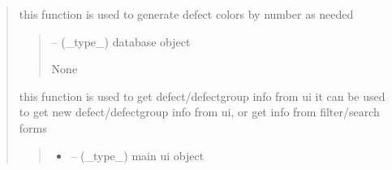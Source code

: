 \documentclass[letterpaper,10pt,english]{sphinxmanual}
\begin{document}
\begin{quote}
\begin{savenotes}\begin{fulllineitems}
\label{\detokenize{setting/backend/defect_management_funcs:oxin.backend.defect_management_funcs.generate_defect_colors}}
\pysigstartsignatures
{}
\pysigstopsignatures
\sphinxAtStartPar
this function is used to generate defect colors by number as needed
\begin{quote}\begin{description}
\sphinxAtStartPar
{} – (\_type\_) database object

\sphinxAtStartPar
None

\end{description}\end{quote}

\end{fulllineitems}\end{savenotes}


\begin{savenotes}\begin{fulllineitems}
\label{\detokenize{setting/backend/defect_management_funcs:oxin.backend.defect_management_funcs.get_defect_info_from_ui}}
\pysigstartsignatures
{}
\pysigstopsignatures
\sphinxAtStartPar
this function is used to get defect/defect\sphinxhyphen{}group info from ui
it can be used to get new defect/defect\sphinxhyphen{}group info from ui, or get info from filter/search forms
\begin{quote}\begin{description}
\begin{itemize}
\item {} 
\sphinxAtStartPar
{} – (\_type\_) main ui object


\end{itemize}
\end{description}
\end{quote}
\end{fulllineitems}
\end{savenotes}
\end{quote}
\end{document}
